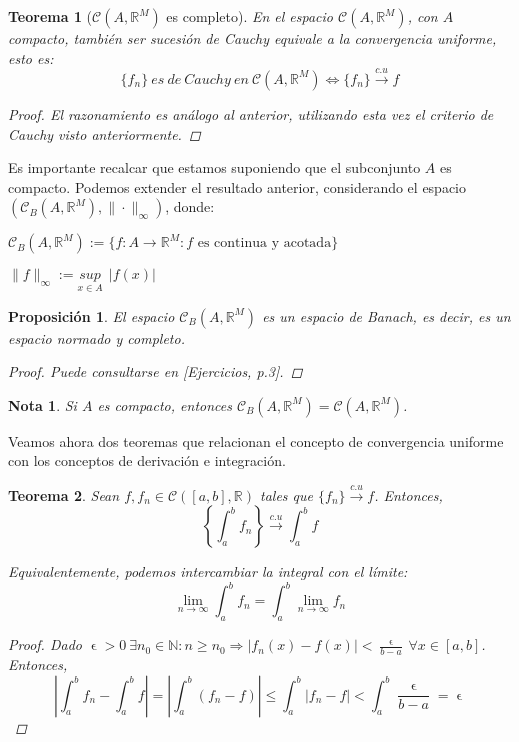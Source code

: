 \documentclass[11pt, a4paper]{article}
\let\epsilon\upvarepsilon
\newcommand{\R}{\mathbb{R}}
\newcommand{\fn}{\{f_n\}}
\theoremstyle{theorem-style}
\newtheorem{nth}{Teorema}[section]
\newtheorem{nprop}{Proposición}[section]
\theoremstyle{definition-style}
\theoremstyle{remark-style}
\newtheorem*{nota}{Nota}
\theoremstyle{example-style}
\begin{document}
\begin{nth}[$\mathcal{C}(A,\R^M)$ es completo] \label{3} En el espacio $\mathcal{C}(A,\mathbb{R}^M)$, con $A$ compacto, también ser sucesión de Cauchy equivale a la convergencia uniforme, esto es: $$\fn\ es\ de\ Cauchy\ en\ \mathcal{C}(A,\mathbb{R}^M) \iff \fn \xrightarrow {c.u} f $$

\begin{proof} El razonamiento es análogo al anterior, utilizando esta vez el criterio de Cauchy visto anteriormente.
\end{proof}
\end{nth}

Es importante recalcar que estamos suponiendo que el subconjunto $A$ es compacto. Podemos extender el resultado anterior, considerando el espacio $(\mathcal{C}_B(A,\mathbb{R}^M), \|\cdot\|_{\infty})$, donde: 

$\mathcal{C}_B(A,\mathbb{R}^M) := \{ f:A \longrightarrow \mathbb{R}^M: \text{$f$ es continua y acotada}\}$

$\|f\|_{\infty} := \underset{x \in A}{sup} \ \ |f(x)|$

\begin{nprop} El espacio $\mathcal{C}_B(A, \mathbb{R}^M)$ es un espacio de Banach, es decir, es un espacio normado y completo.

\begin{proof}


	Puede consultarse en \textit{[Ejercicios, p.3]}.
\end{proof}

\end{nprop}


\begin{nota}
Si $A$ es compacto, entonces  $\mathcal{C}_B(A,\mathbb{R}^M) = \mathcal{C}(A, \mathbb{R}^M)$.
\end{nota}

Veamos ahora dos teoremas que relacionan el concepto de convergencia uniforme con los conceptos de derivación e integración.

\begin{nth} \label{4} Sean $f, f_n \in \mathcal{C}([a,b],\mathbb{R})$ tales que $\fn \xrightarrow {c.u} f$. Entonces, $$\left\{\int_a^b f_n\right\} \xrightarrow {c.u} \int_a^b f $$

Equivalentemente, podemos intercambiar la integral con el límite: $$\lim_{n\rightarrow \infty} \int_a^b f_n = \int_a^b \lim_{n\rightarrow \infty} f_n$$

\begin{proof} Dado $\displaystyle \epsilon >0\ \exists n_0 \in \mathbb{N}: n \ge n_0 \Rightarrow |f_n(x)-f(x)| < \frac{\epsilon}{b-a}\ \forall x \in [a,b]$. Entonces, $$\left| \int_a^b f_n - \int _a^b f \right| = \left| \int_a^b (f_n - f) \right| \le \int_a^b |f_n - f| < \int_a^b \frac{\epsilon}{b-a} = \epsilon$$
\end{proof}
\end{nth}
\end{document}
